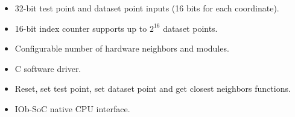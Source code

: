 \begin{itemize}
  \item 32-bit test point and dataset point inputs (16 bits for each coordinate).
  \item 16-bit index counter supports up to $2^{16}$ dataset points.
\item Configurable number of hardware neighbors and modules.
\item C software driver.
\item Reset, set test point, set dataset point and get closest neighbors functions.
\item IOb-SoC native CPU interface.
\end{itemize}
